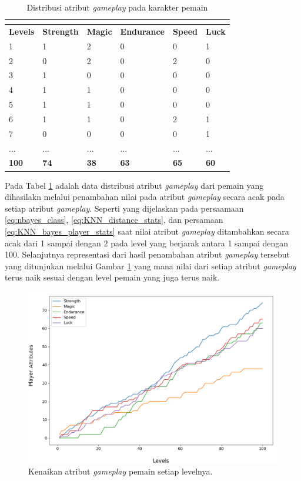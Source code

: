 \begin{longtable}{|l|l|l|l|l|l|}
	\caption{Distribusi atribut \textit{gameplay} pada karakter pemain}
	\vspace{1ex}
	\label{tb:player_battle_stats}\\
	\hline
	\rowcolor[HTML]{C0C0C0} 
	\textbf{Levels} & \textbf{Strength} & \textbf{Magic} & \textbf{Endurance} & \textbf{Speed} & \textbf{Luck} \\ \hline
	1 & 1 & 2 & 0 & 0 & 1 \\ \hline
	2 & 0 & 2 & 0 & 2 & 0 \\ \hline
	3 & 1 & 0 & 0 & 0 & 0 \\ \hline
	4 & 1 & 1 & 0 & 0 & 0 \\ \hline
	5 & 1 & 1 & 0 & 0 & 0 \\ \hline
	6 & 1 & 1 & 0 & 2 & 1 \\ \hline
	7 & 0 & 0 & 0 & 0 & 1 \\ \hline
	... & ... & ... & ... & ... & ... \\ \hline
	\textbf{100} & \textbf{74} & \textbf{38} & \textbf{63} & \textbf{65} & \textbf{60} \\ \hline
\end{longtable}
\vspace{1ex}

Pada Tabel \ref{tb:player_battle_stats} adalah data distribusi atribut \textit{gameplay} dari pemain yang dihasilakn melalui penambahan nilai pada atribut \textit{gameplay} secara acak pada setiap atribut \textit{gameplay}. Seperti yang dijelaskan pada persaamaan \ref{eq:nbayes_class}, \ref{eq:KNN_distance_stats}, dan persamaan \ref{eq:KNN_bayes_player_stats} saat nilai atribut \textit{gameplay} ditambahkan secara acak dari 1 sampai dengan 2 pada level yang berjarak antara 1 sampai dengan 100. Selanjutnya representasi dari hasil penambahan atribut \textit{gameplay} tersebut yang ditunjukan melalui Gambar \ref{fig:stats_player} yang mana nilai dari setiap atribut \textit{gameplay} terus naik sesuai dengan level pemain yang juga terus naik. 
\vspace{1ex}

\begin{figure} [!h] \centering
	\includegraphics[scale=0.45]{img/PlayerStatsDistrib.png}
	\caption{Kenaikan atribut \textit{gameplay} pemain setiap levelnya.}
	\label{fig:stats_player}
\end{figure}

